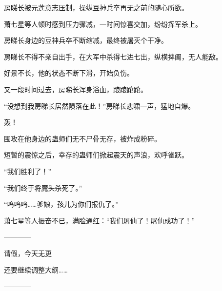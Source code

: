 \begin{this_body}
房睇长被元莲意志压制，操纵豆神兵卒再无之前的随心所欲。

萧七星等人顿时感到压力骤减，一时间惊喜交加，纷纷挥军杀上。

房睇长身边的豆神兵卒不断缩减，最终被屠灭个干净。

房睇长不得不亲自出手，在大军中杀得七进七出，纵横捭阖，无人能敌。

好景不长，他的状态不断下滑，开始负伤。

又一段时间过去，房睇长浑身浴血，踉踉跄跄。

“没想到我房睇长居然陨落在此！”房睇长悲啸一声，猛地自爆。

轰！

围攻在他身边的蛊师们无不尸骨无存，被炸成粉碎。

短暂的震惊之后，幸存的蛊师们掀起震天的声浪，欢呼雀跃。

“我们胜利了！”

“我们终于将魔头杀死了。”

“呜呜呜……爹娘，孩儿为你们报仇了。”

萧七星等人振奋不已，满脸通红：“我们屠仙了！屠仙成功了！”

------------

请假，今天无更

还要继续调整大纲……

------------

\end{this_body}

